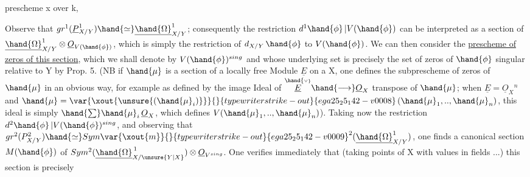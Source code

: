 
prescheme x over k, 

Observe that $gr^1(\underline{P}^1_{X/Y}) \hand{\simeq} \underline{\hand{\Omega}}^1_{X/Y}$; consequently the restriction
$d^1\hand{\phi}\,|V(\hand{\phi})$ can be interpreted as a section of $\underline{\hand{\Omega}}^1_{X/Y} \otimes \underline{O}_{V(\hand{\phi})}$,
which is simply the restriction of $d_{X/Y}\,\hand{\phi}$ to $V(\hand{\phi})$. We
can then consider the \uline{prescheme of zeros of this section}, which
we shall denote by $V(\hand{\phi})^{sing}$ and whose underlying set is precisely
the set of zeros of $\hand{\phi}$ singular relative to Y by Prop. 5.
(NB if  $\hand{\mu}$ is a section of a locally free Module  $\underline{E}$ on a
  X, one defines the subprescheme of
zeros of $\hand{\mu}$ in an obvious way, for example as defined by the image Ideal of $\overset{\hand{\scriptscriptstyle\vee}}{\underline{E}} \hand{\longrightarrow} \underline{O}_X$
transpose of $\hand{\mu}$; when $\underline{E} = \underline{O}_X{}^n$ and $\hand{\mu} = \var{\xout{\unsure{(\hand{\mu}_i)}}}{}{typewriter strike-out}{ega25_25_142-v0008}\,(\hand{\mu}_1,..,\hand{\mu}_n)$, this
ideal is simply $\hand{\sum} \hand{\mu}_i\,\underline{O}_X$, which defines $V(\hand{\mu}_1,..,\hand{\mu}_n)$). Taking
now the restriction $d^2\hand{\phi}\,|V(\hand{\phi})^{sing}$, and observing that
$gr^2(P^2_{X/Y}) \hand{\simeq} Sym\var{\xout{m}}{}{typewriter strike-out}{ega25_25_142-v0009}^2(\underline{\hand{\Omega}}^1_{X/Y})$, one finds a canonical section $M(\hand{\phi})$ of
$Sym^2(\underline{\hand{\Omega}}^{\,1}_{X/\unsure{Y|X}}) \otimes \underline{O}_{V^{sing}}$. One verifies immediately that (taking
points of X with values in fields ...) this section is precisely
